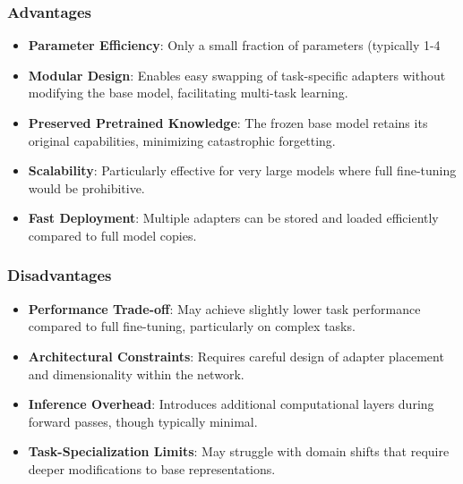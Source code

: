 \subsubsection{Advantages}
\begin{itemize}
\item \textbf{Parameter Efficiency}: Only a small fraction of parameters (typically 1-4%
\item \textbf{Modular Design}: Enables easy swapping of task-specific adapters without modifying the base model, facilitating multi-task learning.
\item \textbf{Preserved Pretrained Knowledge}: The frozen base model retains its original capabilities, minimizing catastrophic forgetting.
\item \textbf{Scalability}: Particularly effective for very large models where full fine-tuning would be prohibitive.
\item \textbf{Fast Deployment}: Multiple adapters can be stored and loaded efficiently compared to full model copies.
\end{itemize}

\subsubsection{Disadvantages}
\begin{itemize}
\item \textbf{Performance Trade-off}: May achieve slightly lower task performance compared to full fine-tuning, particularly on complex tasks.
\item \textbf{Architectural Constraints}: Requires careful design of adapter placement and dimensionality within the network.
\item \textbf{Inference Overhead}: Introduces additional computational layers during forward passes, though typically minimal.
\item \textbf{Task-Specialization Limits}: May struggle with domain shifts that require deeper modifications to base representations.
\end{itemize}

